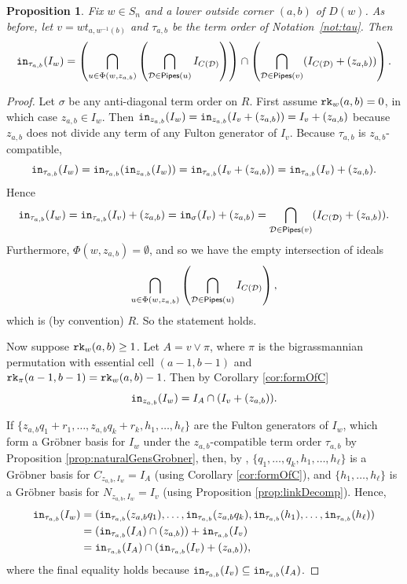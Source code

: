 \documentclass[12pt,reqno]{amsart}
\newtheorem{proposition}[theorem]{Proposition}
\newtheorem{Main Conjecture}[theorem]{Main Conjecture}
\theoremstyle{remark}
\theoremstyle{plain}
\newcommand{\init}{{\tt in}}
\newcommand{\pipes}{{\sf Pipes}}
\newcommand{\rk}{{\tt rk}}
\begin{document}
\begin{proposition}
Fix $w \in S_n$ and a lower outside corner $(a,b)$ of $D(w)$.  As before, let $v = wt_{a,w^{-1}(b)}$ and $\tau_{a,b}$ be the term order of Notation~\ref{not:tau}. 
Then \[\init_{\tau_{a,b}}(I_w)= \left ( \displaystyle \bigcap_{u\in \Phi(w,z_{a,b})}\left(\bigcap_{\mathcal D \in \pipes(u)} I_{C(\mathcal D)} \right)\right )\cap\left(\bigcap_{\mathcal D\in \pipes(v)} ( I_{C(\mathcal D)}+(z_{a,b}))\right).\]
\end{proposition}

\begin{proof}
Let $\sigma$ be any anti-diagonal term order on $R$.  First assume $\rk_w(a,b)=0$, in which case $z_{a,b} \in I_w$.  Then $\init_{z_{a,b}}(I_w)= \init_{z_{a,b}}(I_v+(z_{a,b}))= I_v+(z_{a,b})$ because $z_{a,b}$ does not divide any term of any Fulton generator of $I_v$.   Because $\tau_{a,b}$ is $z_{a,b}$-compatible, \[
\init_{\tau_{a,b}}(I_w) = \init_{\tau_{a,b}}(\init_{z_{a,b}}(I_w)) = \init_{\tau_{a,b}}(I_v+(z_{a,b})) = \init_{\tau_{a,b}}(I_v)+(z_{a,b}).
\]
 Hence \[\init_{\tau_{a,b}}(I_w)=\init_{\tau_{a,b}}(I_v)+(z_{a,b})=\init_\sigma(I_v)+(z_{a,b})=\bigcap_{\mathcal D\in \pipes(v)} ( I_{C(\mathcal D)}+(z_{a,b})).\]  Furthermore, $\Phi(w,z_{a,b})=\emptyset$, and so  we have the empty intersection of ideals \[\displaystyle \bigcap_{u\in \Phi(w,z_{a,b})}\left(\bigcap_{\mathcal D \in \pipes(u)} I_{C(\mathcal D)} \right),\] which is (by convention) $R$.  So the statement holds.


Now suppose $\rk_w(a,b)\geq 1$.  Let $A=v\vee \pi$, where $\pi$ is the bigrassmannian permutation with essential cell $(a-1,b-1)$ and $\rk_\pi(a-1,b-1)=\rk_w(a,b)-1$.  Then by Corollary \ref{cor:formOfC}
\[\init_{z_{a,b}}(I_w)= I_A
\cap(I_v+(z_{a,b})).\]  

If $\{z_{a,b}q_1+r_1, \ldots, z_{a,b}q_k+r_k, h_1, \ldots, h_\ell\}$ are the Fulton generators of $I_w$, which 
form a Gr\"obner basis for $I_w$ under the $z_{a,b}$-compatible term order $\tau_{a,b}$ by Proposition \ref{prop:naturalGensGrobner}, then, by \cite[Theorem 2.1(a)]{KMY09}, $\{q_1, \ldots, q_k, h_1, \ldots, h_\ell\}$ is a Gr\"obner basis for $C_{z_{a,b},I_w}=I_A$ (using Corollary \ref{cor:formOfC}), and $\{h_1, \ldots, h_\ell\}$ is a Gr\"obner basis for $N_{z_{a,b},I_w}=I_v$ (using Proposition \ref{prop:linkDecomp}).  Hence, \begin{align*}
\init_{\tau_{a,b}}(I_w) &= (\init_{\tau_{a,b}}(z_{a,b}q_1), \ldots, \init_{\tau_{a,b}}(z_{a,b}q_k), \init_{\tau_{a,b}}(h_1), \ldots, \init_{\tau_{a,b}}(h_\ell))\\
& = (\init_{\tau_{a,b}}(I_A) \cap (z_{a,b}) )+\init_{\tau_{a,b}}(I_v)\\
& = \init_{\tau_{a,b}}(I_A) \cap (\init_{\tau_{a,b}}(I_v)+(z_{a,b})),
\end{align*} where the final equality holds because 
$\init_{\tau_{a,b}}(I_v) \subseteq \init_{\tau_{a,b}}(I_A)$.


\end{proof}
\end{document}
